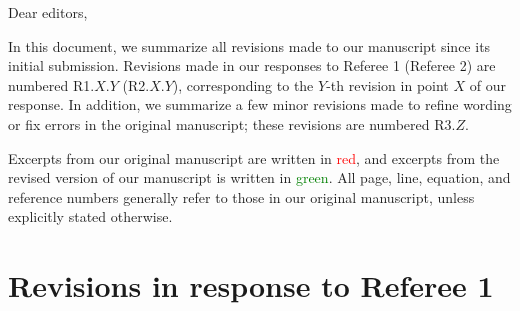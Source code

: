\documentclass[preprint,showkeys,nofootinbib]{revtex4-1}
\newcommand{\1}{\mathds{1}}
\newcommand{\red}[1]{\textcolor{red}{#1}}
\newcommand{\green}[1]{\textcolor{green}{#1}}
\newcounter{point}
\begin{document}
Dear editors,

In this document, we summarize all revisions made to our manuscript
since its initial submission.  Revisions made in our responses to
Referee 1 (Referee 2) are numbered R1.$X$.$Y$ (R2.$X$.$Y$),
corresponding to the $Y$-th revision in point $X$ of our response.  In
addition, we summarize a few minor revisions made to refine wording or
fix errors in the original manuscript; these revisions are numbered
R3.$Z$.

Excerpts from our original manuscript are written in \red{red}, and
excerpts from the revised version of our manuscript is written in
\green{green}.  All page, line, equation, and reference numbers
generally refer to those in our original manuscript, unless explicitly
stated otherwise.


\section*{Revisions in response to Referee 1}
\end{document}
